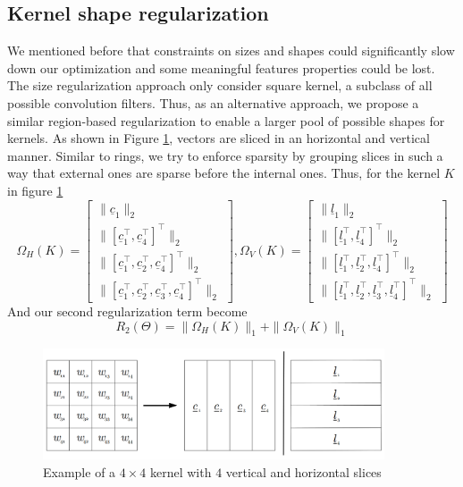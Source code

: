 \documentclass{winnower}
\begin{document}
\subsection{Kernel shape regularization}
We mentioned before that constraints on sizes and shapes could significantly slow down our optimization and some meaningful features properties could be lost. The size regularization approach only consider square kernel, a subclass of all possible convolution filters. Thus, as an alternative approach, we propose a similar region-based regularization to enable a larger pool of possible shapes for kernels. As shown in Figure \ref{fig:kernel-slices}, vectors are sliced in an horizontal and vertical manner. Similar to rings, we try to enforce sparsity by grouping slices in such a way that external ones are sparse before the internal ones. Thus, for the kernel $K$ in figure \ref{fig:kernel-slices} 
\[
	\Omega_H(K) = 
	\begin{bmatrix}
		\|\underline{c}_1 \|_2 \\
		\|\left[\underline{c}_1^\top, \underline{c}_4^\top \right]^\top \|_2 \\
		\|\left[\underline{c}_1^\top, \underline{c}_2^\top, \underline{c}_4^\top \right]^\top\|_2 \\
		\|\left[\underline{c}_1^\top, \underline{c}_2^\top, \underline{c}_3^\top, \underline{c}_4^\top \right]^\top\|_2
	\end{bmatrix},
	\Omega_V(K) = 
	\begin{bmatrix}
		\|\underline{l}_1 \|_2 \\
		\|\left[\underline{l}_1^\top, \underline{l}_4^\top \right]^\top \|_2 \\
		\|\left[\underline{l}_1^\top, \underline{l}_2^\top, \underline{l}_4^\top \right]^\top\|_2 \\
		\|\left[\underline{l}_1^\top, \underline{l}_2^\top, \underline{l}_3^\top, \underline{l}_4^\top \right]^\top\|_2
	\end{bmatrix}
\]  
And our second regularization term become 
\[
	R_2(\Theta) = \|\Omega_H(K)\|_1 + \|\Omega_V(K)\|_1
\]
\begin{figure}[h!]
\centering
\includegraphics[width=0.9\textwidth]{pic/kernel_col_row.png}
\caption{Example of a $4 \times 4$ kernel with $4$ vertical and horizontal slices}
\label{fig:kernel-slices}
\end{figure}
\end{document}
